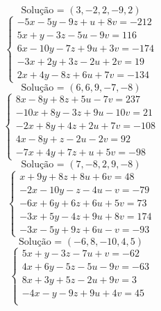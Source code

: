 \documentclass[12pt,oneside,a4paper,fleqn]{article}
\begin{document}
\begin{multicols*}{2}
\begin{equation*}
\text{Solução = }\left(3,-2,2,-9,2\right)
\end{equation*}
\vspace{\baselineskip}
\begin{equation*}
\begin{cases}
-5x-5y-9z+u+8v=-212 \\
5x+y-3z-5u-9v=116 \\
6x-10y-7z+9u+3v=-174 \\
-3x+2y+3z-2u+2v=19 \\
2x+4y-8z+6u+7v=-134
\end{cases}
\end{equation*}
\begin{equation*}
\text{Solução = }\left(6,6,9,-7,-8\right)
\end{equation*}
\vspace{\baselineskip}
\begin{equation*}
\begin{cases}
8x-8y+8z+5u-7v=237 \\
-10x+8y-3z+9u-10v=21 \\
-2x+8y+4z+2u+7v=-108 \\
4x-8y+z-2u-2v=92 \\
-7x+4y+7z+u+5v=-98
\end{cases}
\end{equation*}
\begin{equation*}
\text{Solução = }\left(7,-8,2,9,-8\right)
\end{equation*}
\vspace{\baselineskip}
\begin{equation*}
\begin{cases}
x+9y+8z+8u+6v=48 \\
-2x-10y-z-4u-v=-79 \\
-6x+6y+6z+6u+5v=73 \\
-3x+5y-4z+9u+8v=174 \\
-3x-5y+9z+6u-v=-93
\end{cases}
\end{equation*}
\begin{equation*}
\text{Solução = }\left(-6,8,-10,4,5\right)
\end{equation*}
\vspace{\baselineskip}
\begin{equation*}
\begin{cases}
5x+y-3z-7u+v=-62 \\
4x+6y-5z-5u-9v=-63 \\
8x+3y+5z-2u+9v=3 \\
-4x-y-9z+9u+4v=45 \\

\end{cases}
\end{equation*}
\end{multicols*}
\end{document}

